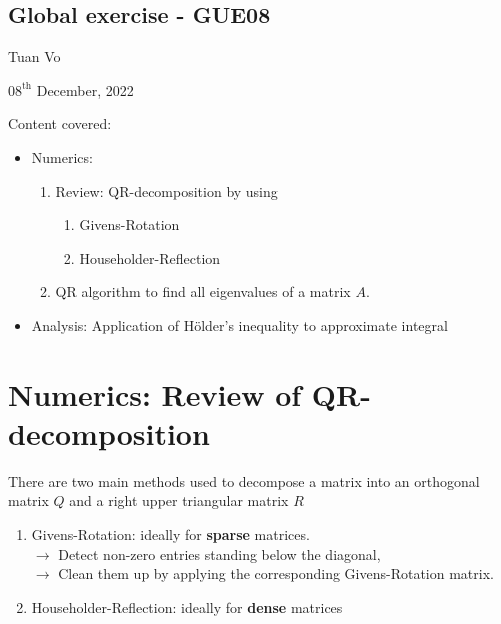 \documentclass[12pt]{article}
\begin{document}
\begin{center}
	\section*{Global exercise - GUE08}
\end{center}
\begin{center}
	Tuan Vo
\end{center}
\begin{center}
	$08^{\text{th}}$ December, 2022
\end{center}
Content covered:
\begin{itemize}
	\item[\checkmark] Numerics:
	      \begin{enumerate}
		      \item Review: QR-decomposition by using
		            \begin{enumerate}
			            \item Givens-Rotation
			            \item Householder-Reflection
		            \end{enumerate}
		      \item QR algorithm to find all eigenvalues of a matrix $A$.
	      \end{enumerate}
	\item[\checkmark] Analysis: Application of Hölder's inequality to approximate integral
\end{itemize}
\section{Numerics: Review of QR-decomposition}
There are two main methods used to decompose a matrix into an orthogonal matrix $Q$
and a right upper triangular matrix $R$
\begin{enumerate}
	\item Givens-Rotation: ideally for \textbf{sparse} matrices.\\
	      $\rightarrow$ Detect non-zero entries standing below the diagonal,\\ 
	      $\rightarrow$ Clean them up by applying the corresponding Givens-Rotation matrix. 
	\item Householder-Reflection: ideally for \textbf{dense} matrices
\end{enumerate}

\clearpage
\end{document}
